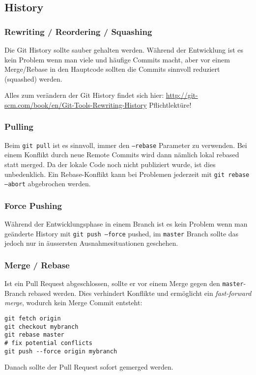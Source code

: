 \documentclass{article}
\begin{document}
\subsection{History}

\subsubsection{Rewriting / Reordering / Squashing}

Die Git History sollte sauber gehalten werden. Während der Entwicklung ist es
kein Problem wenn man viele und häufige Commits macht, aber vor einem
Merge/Rebase in den Hauptcode sollten die Commits sinnvoll reduziert (squashed)
werden. 

Alles zum verändern der Git History findet sich hier:
\url{http://git-scm.com/book/en/Git-Tools-Rewriting-History} Pflichtlektüre!

\subsubsection{Pulling}

Beim \texttt{git pull} ist es sinnvoll, immer den \texttt{--rebase} Parameter zu
verwenden. Bei einem Konflikt durch neue Remote Commits wird dann nämlich lokal
rebased statt merged. Da der lokale Code noch nicht publiziert wurde, ist dies
unbedenklich. Ein Rebase-Konflikt kann bei Problemen jederzeit mit \texttt{git
rebase --abort} abgebrochen werden.

\subsubsection{Force Pushing}

Während der Entwicklungsphase in einem Branch ist es kein Problem wenn man
geänderte History mit \texttt{git push --force} pushed, im \texttt{master}
Branch sollte das jedoch nur in äussersten Ausnahmesituationen geschehen.

\subsubsection{Merge / Rebase}

Ist ein Pull Request abgeschlossen, sollte er vor einem Merge gegen den
\texttt{master}-Branch rebased werden. Dies verhindert Konflikte und ermöglicht
ein \textit{fast-forward merge}, wodurch kein Merge Commit entsteht:

\begin{verbatim}
git fetch origin
git checkout mybranch
git rebase master
# fix potential conflicts
git push --force origin mybranch
\end{verbatim}

Danach sollte der Pull Request sofort gemerged werden.
\end{document}
